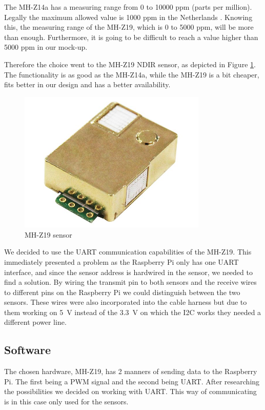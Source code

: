 \documentclass[a4paper,oneside]{book}
\begin{document}
The MH-Z14a has a measuring range from 0 to 10000 ppm (parts per million).
Legally the maximum allowed  value is 1000 ppm in the Netherlands
\cite{bouwbesluit}. Knowing this, the measuring range of the MH-Z19, which is 0
to 5000 ppm, will be more than enough. Furthermore, it is going to be difficult
to reach a  value higher than 5000 ppm in our mock-up.

Therefore the choice went to the MH-Z19 NDIR sensor, as depicted in Figure
\ref{fig:mh-z19}. The functionality is as good as the MH-Z14a, while the
MH-Z19 is a bit cheaper, fits better in our design and has a better
availability.

\begin{figure}[h]
\centering
\includegraphics[width=0.8\textwidth]{images/co2.jpg}
\caption{MH-Z19  sensor \protect\cite{mh-z19}}
\label{fig:mh-z19}
\end{figure}

We decided to use the UART communication capabilities of the MH-Z19. This
immediately presented a problem as the Raspberry Pi only has one UART
interface, and since the sensor address is hardwired in the sensor, we needed
to find a solution. By wiring the transmit pin to both sensors and the receive
wires to different pins on the Raspberry Pi we could distinguish between the
two sensors. These wires were also incorporated into the cable harness but due
to them working on \SI{5}{\volt} instead of the \SI{3.3}{\volt} on which the
I2C works they needed a different power line. 

\subsection{Software}
The chosen hardware, MH-Z19, has 2 manners of sending data to the Raspberry Pi.
The first being a PWM signal and the second being UART. After researching the
possibilities we decided on working with UART. This way of communicating is in
this case only used for the  sensors. 
\end{document}
